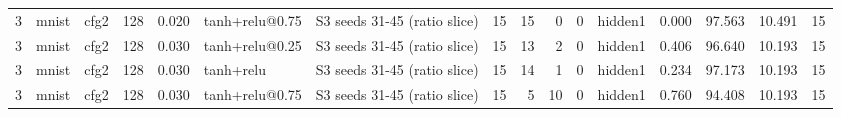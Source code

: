 \begin{table}[htbp]
{\begin{tabular}{@{}rllrrllrrrrlrrrr@{}}
3 & mnist & cfg2 & 128 & 0.020 & tanh+relu@0.75 & S3 seeds 31-45 (ratio slice) & 15 & 15 & 0 & 0 & hidden1 & 0.000 & 97.563 & 10.491 & 15 \\
3 & mnist & cfg2 & 128 & 0.030 & tanh+relu@0.25 & S3 seeds 31-45 (ratio slice) & 15 & 13 & 2 & 0 & hidden1 & 0.406 & 96.640 & 10.193 & 15 \\
3 & mnist & cfg2 & 128 & 0.030 & tanh+relu & S3 seeds 31-45 (ratio slice) & 15 & 14 & 1 & 0 & hidden1 & 0.234 & 97.173 & 10.193 & 15 \\
3 & mnist & cfg2 & 128 & 0.030 & tanh+relu@0.75 & S3 seeds 31-45 (ratio slice) & 15 & 5 & 10 & 0 & hidden1 & 0.760 & 94.408 & 10.193 & 15 \\
\bottomrule
\end{tabular}}
\end{table}
